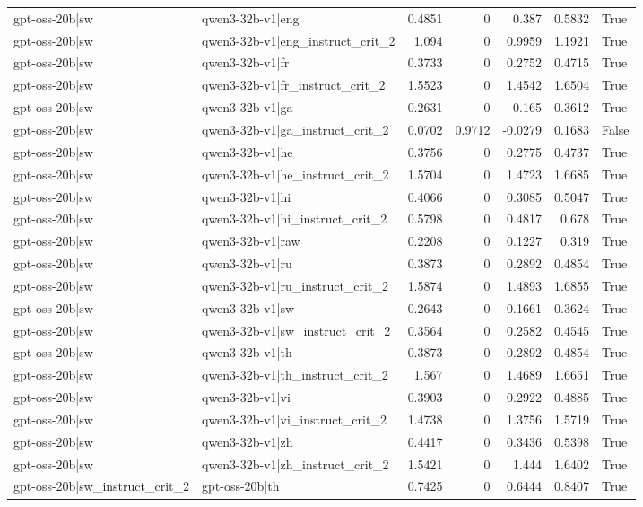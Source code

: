 \begin{table}
\begin{tabular}{l l r r r r l}
gpt-oss-20b|sw & qwen3-32b-v1|eng & 0.4851 & 0 & 0.387 & 0.5832 & True \\
gpt-oss-20b|sw & qwen3-32b-v1|eng_instruct_crit_2 & 1.094 & 0 & 0.9959 & 1.1921 & True \\
gpt-oss-20b|sw & qwen3-32b-v1|fr & 0.3733 & 0 & 0.2752 & 0.4715 & True \\
gpt-oss-20b|sw & qwen3-32b-v1|fr_instruct_crit_2 & 1.5523 & 0 & 1.4542 & 1.6504 & True \\
gpt-oss-20b|sw & qwen3-32b-v1|ga & 0.2631 & 0 & 0.165 & 0.3612 & True \\
gpt-oss-20b|sw & qwen3-32b-v1|ga_instruct_crit_2 & 0.0702 & 0.9712 & -0.0279 & 0.1683 & False \\
gpt-oss-20b|sw & qwen3-32b-v1|he & 0.3756 & 0 & 0.2775 & 0.4737 & True \\
gpt-oss-20b|sw & qwen3-32b-v1|he_instruct_crit_2 & 1.5704 & 0 & 1.4723 & 1.6685 & True \\
gpt-oss-20b|sw & qwen3-32b-v1|hi & 0.4066 & 0 & 0.3085 & 0.5047 & True \\
gpt-oss-20b|sw & qwen3-32b-v1|hi_instruct_crit_2 & 0.5798 & 0 & 0.4817 & 0.678 & True \\
gpt-oss-20b|sw & qwen3-32b-v1|raw & 0.2208 & 0 & 0.1227 & 0.319 & True \\
gpt-oss-20b|sw & qwen3-32b-v1|ru & 0.3873 & 0 & 0.2892 & 0.4854 & True \\
gpt-oss-20b|sw & qwen3-32b-v1|ru_instruct_crit_2 & 1.5874 & 0 & 1.4893 & 1.6855 & True \\
gpt-oss-20b|sw & qwen3-32b-v1|sw & 0.2643 & 0 & 0.1661 & 0.3624 & True \\
gpt-oss-20b|sw & qwen3-32b-v1|sw_instruct_crit_2 & 0.3564 & 0 & 0.2582 & 0.4545 & True \\
gpt-oss-20b|sw & qwen3-32b-v1|th & 0.3873 & 0 & 0.2892 & 0.4854 & True \\
gpt-oss-20b|sw & qwen3-32b-v1|th_instruct_crit_2 & 1.567 & 0 & 1.4689 & 1.6651 & True \\
gpt-oss-20b|sw & qwen3-32b-v1|vi & 0.3903 & 0 & 0.2922 & 0.4885 & True \\
gpt-oss-20b|sw & qwen3-32b-v1|vi_instruct_crit_2 & 1.4738 & 0 & 1.3756 & 1.5719 & True \\
gpt-oss-20b|sw & qwen3-32b-v1|zh & 0.4417 & 0 & 0.3436 & 0.5398 & True \\
gpt-oss-20b|sw & qwen3-32b-v1|zh_instruct_crit_2 & 1.5421 & 0 & 1.444 & 1.6402 & True \\
gpt-oss-20b|sw_instruct_crit_2 & gpt-oss-20b|th & 0.7425 & 0 & 0.6444 & 0.8407 & True \\

\end{tabular}
\end{table}
